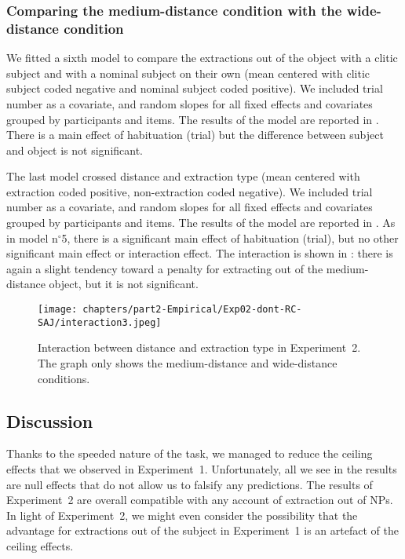 \subsubsection{Comparing the medium-distance condition with the wide-distance condition}
\begin{sloppypar}
We fitted a sixth model to compare the extractions out of the object with a clitic subject and with a nominal subject on their own (mean centered with clitic subject coded negative and nominal subject coded positive). We included trial number as a covariate, and random slopes for all fixed effects and covariates grouped by participants and items. The results of the model are reported in .  There is a main effect of habituation (trial) but the difference between subject and object is not significant.
\end{sloppypar}



The last model crossed distance and extraction type (mean centered with extraction coded positive, non-extraction coded negative). We included trial number as a covariate, and random slopes for all fixed effects and covariates grouped by participants and items. The results of the model are reported in . As in model n$^{\circ}$5, there is a significant main effect of habituation (trial), but no other significant main effect or interaction effect. The interaction is shown in : there is again a slight tendency toward a penalty for extracting out of the medium-distance object, but it is not significant.



\begin{figure}
    \centering
    \texttt{[image: chapters/part2-Empirical/Exp02-dont-RC-SAJ/interaction3.jpeg]}
    \caption{Interaction between distance and extraction type in Experiment~2. The graph only shows the medium-distance and wide-distance conditions.}
    \label{fig:exp02-interaction3}
\end{figure}

\subsection{Discussion}

Thanks to the speeded nature of the task, we managed to reduce the ceiling effects that we observed in Experiment~1. Unfortunately, all we see in the results are null effects that do not allow us to falsify any predictions. The results of Experiment~2 are overall compatible with any account of extraction out of NPs. In light of Experiment~2, we might even consider the possibility that the advantage for extractions out of the subject in Experiment~1 is an artefact of the ceiling effects.


